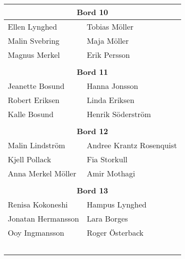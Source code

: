 \documentclass[a5paper]{article}
\begin{document}
\begin{landscape}
\begin{center}
\begin{tabular}{  l  l }
				\multicolumn{2}{c}{\textbf{Bord 10}} 				\\ \hline
				Ellen Lynghed	&	Tobias Möller	\\
				Malin Svebring	&	Maja Möller	\\ 
				Magnus Merkel	&	Erik Persson	\\ 
				&										\\ 
				
				\multicolumn{2}{c}{\textbf{Bord 11}} 				\\ \hline
				Jeanette Bosund	&	Hanna Jonsson	\\
				Robert Eriksen	&	Linda Eriksen	\\ 
				Kalle Bosund	&	Henrik Söderström	\\ 
				&										\\ 
				
				\multicolumn{2}{c}{\textbf{Bord 12}} 				\\ \hline
				Malin Lindström	&	Andree Krantz Rosenquist	\\
				Kjell Pollack	&	Fia Storkull	\\ 
				Anna Merkel Möller	&	Amir Mothagi	\\ 		
				& \\ 
				\multicolumn{2}{c}{\textbf{Bord 13}} 				\\ \hline
				Renisa Kokoneshi	&	Hampus Lynghed	\\
				Jonatan Hermansson	&	Lara Borges	\\ 
				Ooy Ingmansson	&	Roger Österback	\\ 
				&									\\ \\ \\ \\ \\
				
			\end{tabular}
		\end{center}
		\newpage
		
	\end{landscape}
	\endgroup
	
	
	
\end{document}
